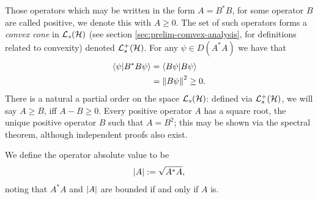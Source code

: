 Those operators which may be written in the form $A = B^*B$, for some operator $B$ are called positive, we denote this with $A\geq 0$. The set of such operators forms a \emph{convex  cone} in $\saops[\hcal]$ (see section \ref{sec:prelim-comvex-analysis}, for definitions related to convexity) denoted $\posops[\hcal]$. For any $\psi\in D(A^*A)$ we have that 
\begin{align}
  \langle\psi | B^* B \psi \rangle &= \langle B \psi | B \psi\rangle \\
                                  &= {\left\lVert{B\psi}\right\rVert}^2 \geq 0.
\end{align}
There is a natural a partial order on the space $\saops[\hcal]$: defined via $\posops[\hcal]$, we will say $A\geq B$, iff $A-B\geq 0$. Every positive operator $A$ has a square root, the unique positive operator $B$ such that $A = B^2$; this may be shown via the spectral theorem, although independent proofs also exist.


We define the operator absolute value to be
\begin{align}
  {\left\lvert{A}\right\rvert} := \sqrt{A^*A},
\end{align}
noting that $A^*A$ and ${\left\lvert{A}\right\rvert}$ are bounded if and only if $A$ is.

